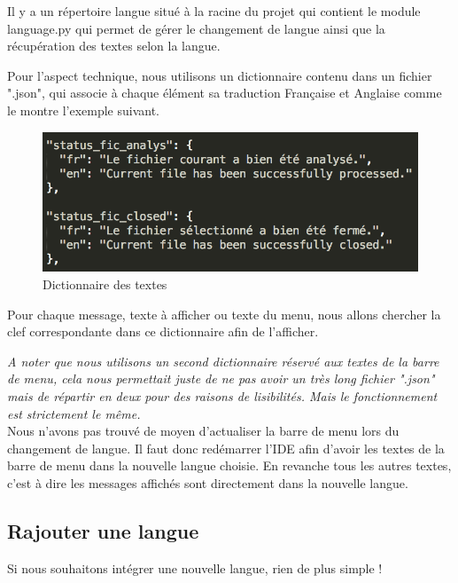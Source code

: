 \documentclass[a4paper,12pt]{article}
\begin{document}
	Il y a un répertoire langue situé à la racine du projet qui contient le module language.py qui permet de gérer le changement de langue ainsi que la récupération des textes selon la langue.
	
	Pour l'aspect technique, nous utilisons un dictionnaire contenu dans un fichier ".json", qui associe à chaque élément sa traduction Française et Anglaise comme le montre l'exemple suivant.
	
	\begin{figure}[h!]
			\begin{center}
					\includegraphics[scale=1]{images/langue_json}
					\caption{Dictionnaire des textes}
			\end{center}
	\end{figure}
	
	Pour chaque message, texte à afficher ou texte du menu, nous allons chercher la clef correspondante dans ce dictionnaire afin de l'afficher. 
	
	\textit{A noter que nous utilisons un second dictionnaire réservé aux textes de la barre de menu, cela nous permettait juste de ne pas avoir un très long fichier ".json" mais de répartir en deux pour des raisons de lisibilités. Mais le fonctionnement est strictement le même.}\\
	
	Nous n'avons pas trouvé de moyen d'actualiser la barre de menu lors du changement de langue. Il faut donc redémarrer l'IDE afin d'avoir les textes de la barre de menu dans la nouvelle langue choisie. En revanche tous les autres textes, c'est à dire les messages affichés sont directement dans la nouvelle langue.
	
	\subsection{Rajouter une langue}

	Si nous souhaitons intégrer une nouvelle langue, rien de plus simple !\\
	
\end{document}
